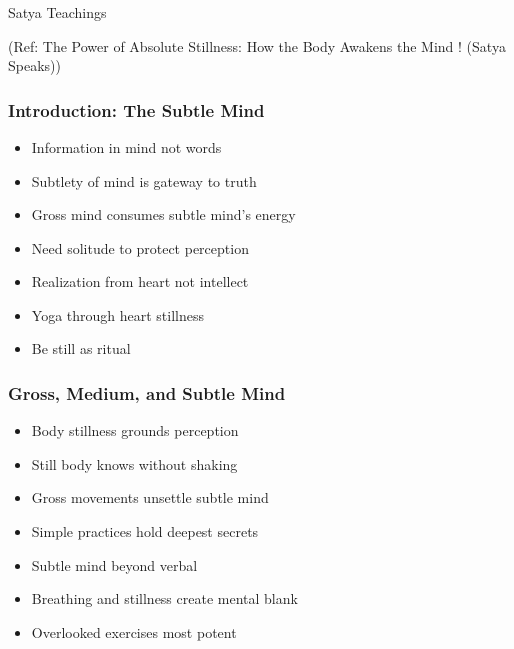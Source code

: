 \begin{frame}[fragile]\frametitle{}
\begin{center}
{\Large Satya Teachings}
\end{center}

{\tiny (Ref: The Power of Absolute Stillness: How the Body Awakens the Mind ! (Satya Speaks))}

\end{frame}

\begin{frame}[fragile]\frametitle{Introduction: The Subtle Mind}
  \begin{itemize}
    \item Information in mind not words
    \item Subtlety of mind is gateway to truth
    \item Gross mind consumes subtle mind's energy
    \item Need solitude to protect perception
    \item Realization from heart not intellect
    \item Yoga through heart stillness
    \item Be still as ritual
  \end{itemize}
\end{frame}

\begin{frame}[fragile]\frametitle{Gross, Medium, and Subtle Mind}
  \begin{itemize}
    \item Body stillness grounds perception
    \item Still body knows without shaking
    \item Gross movements unsettle subtle mind
    \item Simple practices hold deepest secrets
    \item Subtle mind beyond verbal
    \item Breathing and stillness create mental blank
    \item Overlooked exercises most potent
  \end{itemize}
\end{frame}

